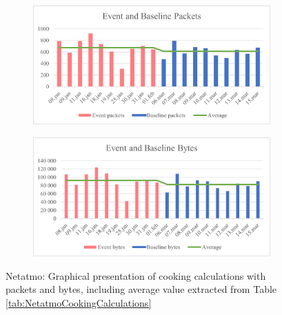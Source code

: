 \begin{figure}[H]
    \centering
    \begin{subfigure}{0.6\textwidth}
       \centering
       \includegraphics[width=1\hsize]{figures/Netatmo_Cooking_Calculations_Packets.png} 
    \end{subfigure}
    \begin{subfigure}{0.6\textwidth}
        \centering
        \includegraphics[width=1\hsize]{figures/Netatmo_Cooking_Calculations_Bytes.png} 
    \end{subfigure}
    \caption{Netatmo: Graphical presentation of cooking calculations with packets and bytes, including average value extracted from Table \ref{tab:NetatmoCookingCalculations}}
    \label{fig:NetatmoCookingCalculations}
\end{figure}

